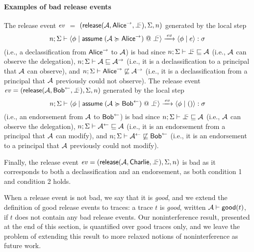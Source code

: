 \paragraph{Examples of bad release events}
The release event $\mathit{ev}$ $=$ $(\releaseevent{\Attacker}{\conf{\mathsf{Alice}}}{\botinfoflow}, \env, n)$ generated by the local step
\begin{equation*}
\step{n; \env}[][\event]{\config{\store}{\adddelegate{\Attacker}{\conf{\mathsf{Alice}}}{\botinfoflow}}}{\config{\store}{\expr}}{\sigma}
\end{equation*}
(i.e., a declassification from $\mathsf{Alice}^{\rightarrow}$ to $\mathcal{A}$) is bad since $\nopostflowstoquery{n; \env}{\botinfoflow}{\Attacker}$ (i.e., $\mathcal{A}$ can observe the delegation), $n; \Sigma \vdash \mathcal{A} \sqsubseteq \mathcal{A}^{\rightarrow}$ (i.e., it is a declassification to a principal that $\mathcal{A}$ can observe), and $n; \Sigma \vdash \mathsf{Alice}^{\rightarrow} \not\sqsubseteq \mathcal{A}^{\rightarrow}$ (i.e., it is a declassification from a principal that $\mathcal{A}$ previously could not observe). The release event $\event = (\releaseevent{\Attacker}{\integ{\mathsf{Bob}}}{\botinfoflow}, \env, n)$ generated by the local step
\begin{equation*}
\step{n; \env}[][\event]{\config{\store}{\adddelegate{\Attacker}{\integ{\mathsf{Bob}}}{\botinfoflow}}}{\config{\store}{()}}{\sigma}
\end{equation*}
(i.e., an endorsement from $\mathcal{A}$ to $\mathsf{Bob}^{\leftarrow}$) is bad since $\nopostflowstoquery{n; \env}{\botinfoflow}{\Attacker}$ (i.e., $\mathcal{A}$ can observe the delegation), $n; \Sigma \vdash \mathcal{A}^{\leftarrow} \sqsubseteq \mathcal{A}$ (i.e., it is an endorsement from a principal that $\mathcal{A}$ can modify), and $n; \Sigma \vdash \mathcal{A}^{\leftarrow} \not\sqsubseteq \mathsf{Bob}^{\leftarrow}$ (i.e., it is an endorsement to a principal that $\mathcal{A}$ previously could not modify).

Finally, the release event $\event = (\releaseevent{\Attacker}{\mathsf{Charlie}}{\botinfoflow}, \env, n)$ is bad as it corresponds to both a declassification and an endorsement, as both condition 1 and condition 2 holds.

When a release event is not bad, we say that it is \emph{good}, and we extend the definition of good release events to traces: a trace $t$ is \emph{good}, written $\mathcal{A} \vdash \mathsf{good}(t)$, if $t$ does not contain any bad release events. Our noninterference result, presented at the end of this section, is quantified over good traces only, and we leave the problem of extending this result to more relaxed notions of noninterference as future work.

